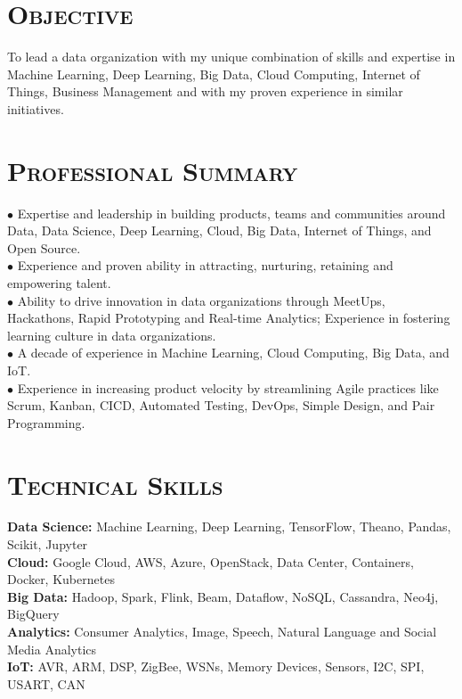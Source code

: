 \begin{resume}


\section{\textsc{Objective}} To lead a data organization with my unique combination of skills and expertise in Machine Learning, Deep Learning, Big Data, Cloud Computing, Internet of Things, Business Management and with my proven experience in similar initiatives.
\section{\textsc{Professional Summary}}
$\bullet$ Expertise and leadership in building products, teams and communities around Data, Data Science, Deep Learning, Cloud, Big Data, Internet of Things, and Open Source.\\
$\bullet$ Experience and proven ability in attracting, nurturing, retaining and empowering talent.\\
$\bullet$ Ability to drive innovation in data organizations through MeetUps, Hackathons, Rapid Prototyping and Real-time Analytics; Experience in fostering learning culture in data organizations.\\
$\bullet$ A decade of experience in Machine Learning, Cloud Computing, Big Data, and IoT.\\
$\bullet$ Experience in increasing product velocity by streamlining Agile practices like Scrum, Kanban, CICD, Automated Testing, DevOps, Simple Design, and Pair Programming.

\section{\textsc{Technical Skills}}
{\bf Data Science:} Machine Learning, Deep Learning, TensorFlow, Theano, Pandas, Scikit, Jupyter\\
{\bf Cloud:} Google Cloud, AWS, Azure, OpenStack, Data Center, Containers, Docker, Kubernetes \\
{\bf Big Data:} Hadoop, Spark, Flink, Beam, Dataflow, NoSQL, Cassandra, Neo4j, BigQuery\\
{\bf Analytics:} Consumer Analytics, Image, Speech, Natural Language and Social Media Analytics\\
{\bf IoT:} AVR, ARM, DSP, ZigBee, WSNs, Memory Devices, Sensors, I2C, SPI, USART, CAN


\end{resume}
